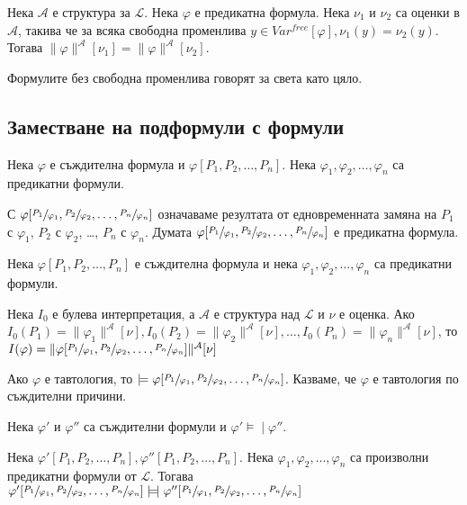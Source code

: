 \documentclass{article}
\newcommand{\mymod}{\models\!\mid}
\begin{document}
\begin{claim}
Нека $\mathcal{A}$ е структура за $\mathcal{L}$. Нека $\varphi$ е предикатна формула. Нека $\nu_1$ и $\nu_2$ са оценки в $\mathcal{A}$, такива че за всяка свободна променлива $y \in Var^{free}[\varphi], \nu_1(y) = \nu_2(y)$. Тогава $\|\varphi\|^\mathcal{A}[\nu_1] = \|\varphi\|^\mathcal{A}[\nu_2]$.

\begin{remark}
Формулите без свободна променлива говорят за света като цяло.
\end{remark}

\end{claim}

\subsection*{Заместване на подформули с формули}

\begin{claim}
Нека $\varphi$ е съждителна формула и $\varphi[P_1, P_2, \ldots, P_n]$. Нека $\varphi_1, \varphi_2, \ldots, \varphi_n$ са предикатни формули.

С $\varphi[\sfrac{P_1}{\varphi_1}, \sfrac{P_2}{\varphi_2}, \ldots, \sfrac{P_n}{\varphi_n}]$ означаваме резултата от едновременната замяна на $P_1$ с $\varphi_1$, $P_2$ с $\varphi_2$, \ldots, $P_n$ с $\varphi_n$. Думата $\varphi[\sfrac{P_1}{\varphi_1}, \sfrac{P_2}{\varphi_2}, \ldots, \sfrac{P_n}{\varphi_n}]$ е предикатна формула.
\end{claim}

\begin{claim}
Нека $\varphi[P_1, P_2, \ldots, P_n]$ е съждителна формула и нека $\varphi_1, \varphi_2, \ldots, \varphi_n$ са предикатни формули.

Нека $I_0$ е булева интерпретация, а $\mathcal{A}$ е структура над $\mathcal{L}$ и $\nu$ е оценка. Ако $I_0(P_1) = \|\varphi_1\|^\mathcal{A}[\nu], I_0(P_2) = \|\varphi_2\|^\mathcal{A}[\nu], \ldots, I_0(P_n) = \|\varphi_n\|^\mathcal{A}[\nu]$, то $I(\varphi) = \|\varphi[\sfrac{P_1}{\varphi_1}, \sfrac{P_2}{\varphi_2}, \ldots, \sfrac{P_n}{\varphi_n}]\|^\mathcal{A}[\nu]$

\setcounter{conseq}{0}
\begin{conseq}
Ако $\varphi$ е тавтология, то $\models \varphi[\sfrac{P_1}{\varphi_1}, \sfrac{P_2}{\varphi_2}, \ldots, \sfrac{P_n}{\varphi_n}]$. Казваме, че $\varphi$ е тавтология по съждителни причини.
\end{conseq}

\begin{conseq}
Нека $\varphi'$ и $\varphi''$ са съждителни формули и $\varphi' \mymod \varphi''$.

Нека $\varphi'[P_1, P_2, \ldots, P_n], \varphi''[P_1, P_2, \ldots, P_n]$. Нека $\varphi_1, \varphi_2, \ldots, \varphi_n$ са произволни предикатни формули от $\mathcal{L}$. 
Тогава $\varphi'[\sfrac{P_1}{\varphi_1}, \sfrac{P_2}{\varphi_2}, \ldots, \sfrac{P_n}{\varphi_n}] \mymod \varphi''[\sfrac{P_1}{\varphi_1}, \sfrac{P_2}{\varphi_2}, \ldots, \sfrac{P_n}{\varphi_n}]$
\end{conseq}

\end{claim}
\end{document}
